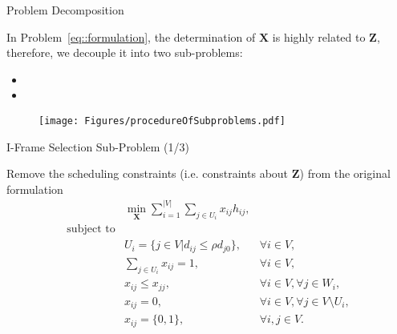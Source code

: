 \begin{frame}{Problem Decomposition}
\begin{itemize}
	\myItem In Problem~\eqref{eq::formulation}, the determination of $\mathbf{X}$ is highly related to $\mathbf{Z}$, therefore, we decouple it into two sub-problems:
	\begin{itemize}
		\mySubItem I-frame selection sub-problem $\xLongrightarrow{\text{solve   }}$ $\mathbf{X}$
		\mySubItem P-frame association sub-problem $\xLongrightarrow{\text{solve   }}$ $\mathbf{Z}$
		\item[]
		\item[]
	\end{itemize}
	\begin{figure}
		\centering
		\texttt{[image: Figures/procedureOfSubproblems.pdf]}
	\end{figure}
\end{itemize}
\end{frame}
\begin{frame}{I-Frame Selection Sub-Problem (1/3)}
\begin{itemize}
	\myItem Remove the scheduling constraints (i.e. constraints about $\mathbf{Z}$) from the original formulation
	{\small \begin{align}
		&\underset{\mathbf{X}}{\min} \sum_{i=1}^{|V|} \sum_{j \in U_i}  x_{ij} h_{ij}, & \nonumber \\
		\text{subject to} & & \nonumber \\
		&U_i = \{ j \in V | d_{ij} \leq \rho d_{j0} \}, &\forall i \in V, \nonumber \\
		&\sum_{j \in U_i} x_{ij} = 1, &\forall i \in V, \nonumber \\
		&x_{ij} \leq x_{jj}, &\forall i \in V, \forall j \in W_i, \nonumber \\
		&x_{ij} = 0, &\forall i \in V, \forall j \in V \setminus U_i, \nonumber \\
		&x_{ij} = \{0,1\}, &\forall i,j \in V.
		\label{eq::formulationSimplified}
	\end{align} }%
\end{itemize}
\end{frame}
